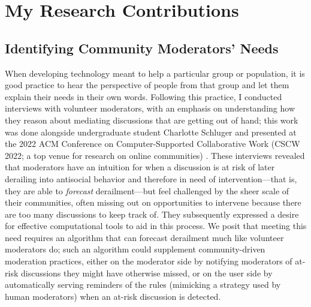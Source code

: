 \documentclass[11pt,letterpaper]{article}
\begin{document}
\section{My Research Contributions}

\subsection{Identifying Community Moderators' Needs}
When developing technology meant to help a particular group or population, it is good practice to hear the perspective of people from that group and let them explain their needs in their own words.
Following this practice, I conducted interviews with volunteer moderators, with an emphasis on understanding how they reason about mediating discussions that are getting out of hand; this work was done alongside undergraduate student Charlotte Schluger and presented at the 2022 ACM Conference on Computer-Supported Collaborative Work (CSCW 2022; a top venue for research on online communities) \cite{schluger_proactive_2022}.
These interviews revealed that moderators have an intuition for when a discussion is at risk of later derailing into antisocial behavior and therefore in need of intervention---that is, they are able to \emph{forecast} derailment---but feel challenged by the sheer scale of their communities, often missing out on opportunities to intervene because there are too many discussions to keep track of.
They subsequently expressed a desire for effective computational tools to aid in this process.
We posit that meeting this need requires an algorithm that can forecast derailment much like volunteer moderators do; such an algorithm could supplement community-driven moderation practices, either on the moderator side by notifying moderators of at-risk discussions they might have otherwise missed, or on the user side by automatically serving reminders of the rules (mimicking a strategy used by human moderators) when an at-risk discussion is detected.
\end{document}
